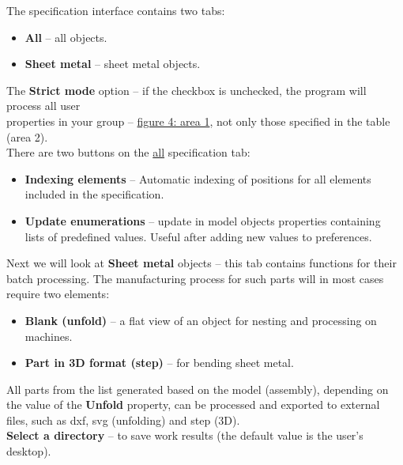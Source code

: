 \documentclass[a4paper,12pt]{article}
\begin{document}
\pagebreak

The specification interface contains two tabs:
\begin{itemize}
	\item \textbf{All} -- all objects.
	\item \textbf{Sheet metal} -- sheet metal objects.\\
\end{itemize}

The \textbf{Strict mode} option -- if the checkbox is unchecked, the program will process all user\\ properties in your group -- \hyperref[sec:pref_specification]{figure 4: area 1}, not only those specified in the table (area 2).\\

There are two buttons on the \hyperref[sec:specification_sm]{all} specification tab:
\begin{itemize}
	\item \textbf{Indexing elements} -- Automatic indexing of positions for all elements\\included in the specification.
	\item \textbf{Update enumerations} -- update in model objects properties containing\\lists of predefined values. Useful after adding new values ​​to preferences.\\
\end{itemize}

Next we will look at \textbf{Sheet metal} objects -- this tab contains functions for their batch processing. The manufacturing process for such parts will in most cases require two elements:
\begin{itemize}
	\item \textbf{Blank (unfold)} -- a flat view of an object for nesting and processing on machines.
	\item \textbf{Part in 3D format (step)} -- for bending sheet metal.\\
\end{itemize}

All parts from the list generated based on the model (assembly), depending on the value of the \textbf{Unfold} property, can be processed and exported to external files, such as dxf, svg (unfolding) and step (3D).\\

\textbf{Select a directory} -- to save work results (the default value is the user's desktop).\\
\end{document}
